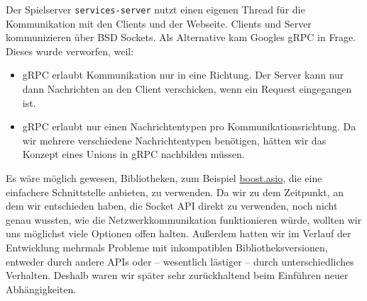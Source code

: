 Der Spielserver \texttt{services-server} nutzt einen eigenen Thread für die Kommunikation mit den Clients und
der Webseite. Clients und Server kommunizieren über BSD Sockets.
Als Alternative kam Googles gRPC in Frage. Dieses wurde verworfen, weil:
\begin{itemize}
    \item gRPC erlaubt Kommunikation nur in eine Richtung. Der Server kann nur dann Nachrichten an den Client verschicken,  wenn ein Request eingegangen ist.
    \item gRPC erlaubt nur einen Nachrichtentypen pro Kommunikationsrichtung. Da wir mehrere verschiedene Nachrichtentypen benötigen, hätten wir das Konzept eines Unions in gRPC nachbilden müssen.
\end{itemize}
Es wäre möglich gewesen, Bibliotheken, zum Beispiel \href{http://think-async.com/Asio/WebHome}{boost.asio}, die eine einfachere Schnittstelle anbieten, zu verwenden. Da wir zu dem Zeitpunkt, an dem wir entschieden haben, die Socket API direkt zu verwenden, noch nicht genau wussten, wie die Netzwerkkommunikation funktionieren würde, wollten wir uns möglichst viele Optionen offen halten. Außerdem hatten wir im Verlauf der Entwicklung mehrmals Probleme mit inkompatiblen Bibliotheksversionen, entweder durch andere APIs oder – wesentlich lästiger – durch unterschiedliches Verhalten. Deshalb waren wir später sehr zurückhaltend beim Einführen neuer Abhängigkeiten.


